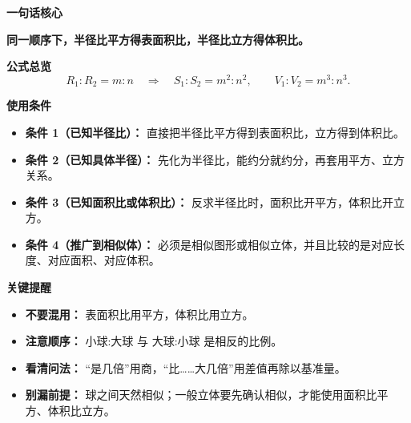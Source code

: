 \begin{summarybox}

\textbf{\textcolor{CSummary}{一句话核心}}

\textbf{同一顺序下，半径比平方得表面积比，半径比立方得体积比。}

\medskip
\textbf{\textcolor{CSummary}{公式总览}}
\[
R_1:R_2=m:n
\quad\Longrightarrow\quad
S_1:S_2=m^2:n^2,
\qquad
V_1:V_2=m^3:n^3.
\]

\medskip
\textbf{\textcolor{CSummary}{使用条件}}
\begin{itemize}[leftmargin=*, itemsep=0.5em, topsep=0.4em]
    \item \textbf{条件 1（已知半径比）：} 直接把半径比平方得到表面积比，立方得到体积比。
    \item \textbf{条件 2（已知具体半径）：} 先化为半径比，能约分就约分，再套用平方、立方关系。
    \item \textbf{条件 3（已知面积比或体积比）：} 反求半径比时，面积比开平方，体积比开立方。
    \item \textbf{条件 4（推广到相似体）：} 必须是相似图形或相似立体，并且比较的是对应长度、对应面积、对应体积。
\end{itemize}

\medskip
\textbf{\textcolor{CSummary}{关键提醒}}
\begin{itemize}[leftmargin=*, itemsep=0.5em, topsep=0.4em]
    \item \textbf{不要混用：} 表面积比用平方，体积比用立方。
    \item \textbf{注意顺序：} 小球:大球 与 大球:小球 是相反的比例。
    \item \textbf{看清问法：} “是几倍”用商，“比……大几倍”用差值再除以基准量。
    \item \textbf{别漏前提：} 球之间天然相似；一般立体要先确认相似，才能使用面积比平方、体积比立方。
\end{itemize}
\end{summarybox}
